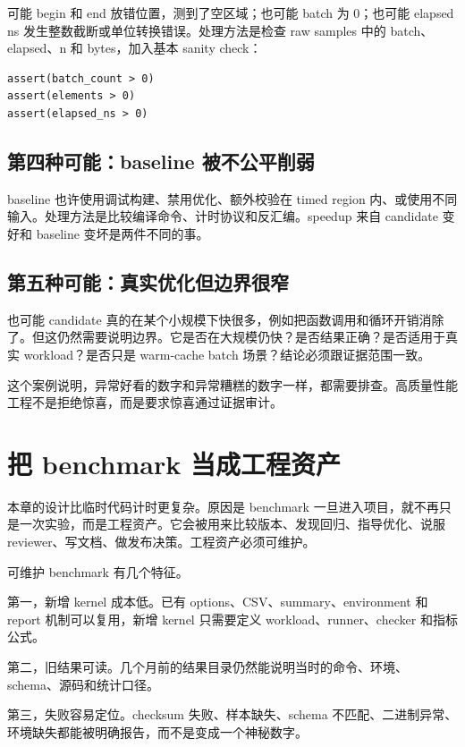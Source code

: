 可能 begin 和 end 放错位置，测到了空区域；也可能 batch 为 0；也可能 elapsed ns 发生整数截断或单位转换错误。处理方法是检查 raw samples 中的 batch、elapsed、n 和 bytes，加入基本 sanity check：

\begin{lstlisting}
assert(batch_count > 0)
assert(elements > 0)
assert(elapsed_ns > 0)
\end{lstlisting}

\subsection{第四种可能：baseline 被不公平削弱}

baseline 也许使用调试构建、禁用优化、额外校验在 timed region 内、或使用不同输入。处理方法是比较编译命令、计时协议和反汇编。speedup 来自 candidate 变好和 baseline 变坏是两件不同的事。

\subsection{第五种可能：真实优化但边界很窄}

也可能 candidate 真的在某个小规模下快很多，例如把函数调用和循环开销消除了。但这仍然需要说明边界。它是否在大规模仍快？是否结果正确？是否适用于真实 workload？是否只是 warm-cache batch 场景？结论必须跟证据范围一致。

这个案例说明，异常好看的数字和异常糟糕的数字一样，都需要排查。高质量性能工程不是拒绝惊喜，而是要求惊喜通过证据审计。

\section{把 benchmark 当成工程资产}

本章的设计比临时代码计时更复杂。原因是 benchmark 一旦进入项目，就不再只是一次实验，而是工程资产。它会被用来比较版本、发现回归、指导优化、说服 reviewer、写文档、做发布决策。工程资产必须可维护。

可维护 benchmark 有几个特征。

第一，新增 kernel 成本低。已有 options、CSV、summary、environment 和 report 机制可以复用，新增 kernel 只需要定义 workload、runner、checker 和指标公式。

第二，旧结果可读。几个月前的结果目录仍然能说明当时的命令、环境、schema、源码和统计口径。

第三，失败容易定位。checksum 失败、样本缺失、schema 不匹配、二进制异常、环境缺失都能被明确报告，而不是变成一个神秘数字。

